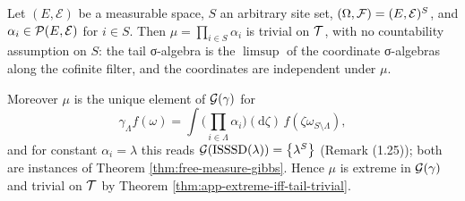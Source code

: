 \begin{example}
    \label{ex:app-kolmogorov}
    \leanok

    Let $(E, \mathcal{E})$ be a measurable space, $S$ an arbitrary site set,
    $(\Omega, \mathcal{F}) = (E, \mathcal{E})^S$, and $\alpha_i \in \mathcal{P}(E, \mathcal{E})$ for
    $i \in S$.  Then $\mu = \prod_{i \in S} \alpha_i$ is trivial on $\mathcal{T}$, with no
    countability assumption on $S$: the tail σ-algebra is the $\limsup$ of the coordinate
    σ-algebras along the cofinite filter, and the coordinates are independent under $\mu$.

    Moreover $\mu$ is the unique element of $\mathcal{G}(\gamma)$ for
    \[\gamma_\Lambda f(\omega) = \int \Big(\prod_{i \in \Lambda} \alpha_i\Big)(\mathrm{d}\zeta)\,
      f(\zeta\omega_{S \setminus \Lambda}),\]
    and for constant $\alpha_i = \lambda$ this reads $\mathcal{G}(\operatorname{ISSSD}(\lambda)) = \left\{ \lambda^S \right\}$
    (Remark (1.25)); both are instances of Theorem \ref{thm:free-measure-gibbs}.  Hence $\mu$
    is extreme in $\mathcal{G}(\gamma)$ and trivial on $\mathcal{T}$ by
    Theorem \ref{thm:app-extreme-iff-tail-trivial}.
\end{example}

